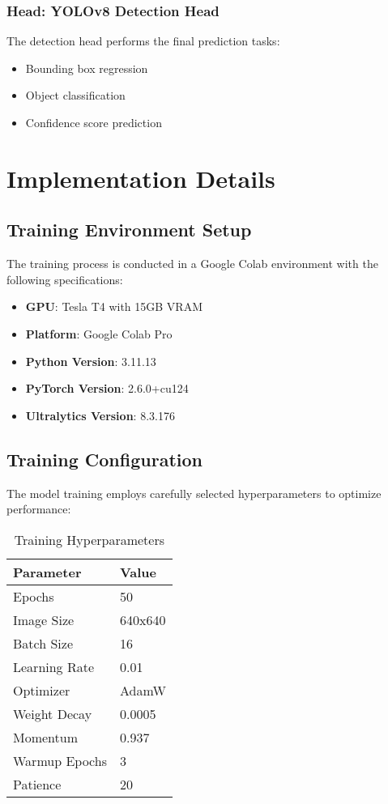 \documentclass[12pt,a4paper]{article}
\begin{document}
\subsubsection{Head: YOLOv8 Detection Head}

The detection head performs the final prediction tasks:

\begin{itemize}
    \item Bounding box regression
    \item Object classification
    \item Confidence score prediction
\end{itemize}

\section{Implementation Details}

\subsection{Training Environment Setup}

The training process is conducted in a Google Colab environment with the following specifications:

\begin{itemize}
    \item \textbf{GPU}: Tesla T4 with 15GB VRAM
    \item \textbf{Platform}: Google Colab Pro
    \item \textbf{Python Version}: 3.11.13
    \item \textbf{PyTorch Version}: 2.6.0+cu124
    \item \textbf{Ultralytics Version}: 8.3.176
\end{itemize}

\subsection{Training Configuration}

The model training employs carefully selected hyperparameters to optimize performance:

\begin{table}[H]
\centering
\begin{tabular}{|l|l|}
\hline
\textbf{Parameter} & \textbf{Value} \\
\hline
Epochs & 50 \\
Image Size & 640x640 \\
Batch Size & 16 \\
Learning Rate & 0.01 \\
Optimizer & AdamW \\
Weight Decay & 0.0005 \\
Momentum & 0.937 \\
Warmup Epochs & 3 \\
Patience & 20 \\
\hline
\end{tabular}
\caption{Training Hyperparameters}
\end{table}
\end{document}
